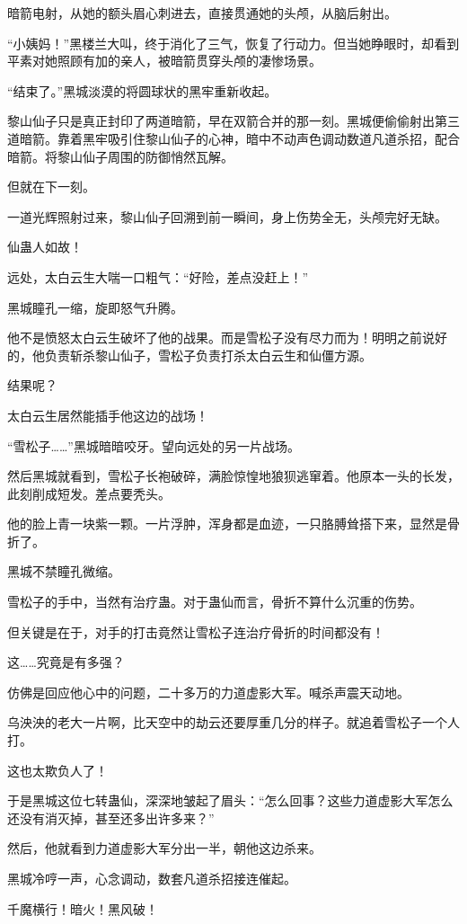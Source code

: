 \begin{this_body}
暗箭电射，从她的额头眉心刺进去，直接贯通她的头颅，从脑后射出。

“小姨妈！”黑楼兰大叫，终于消化了三气，恢复了行动力。但当她睁眼时，却看到平素对她照顾有加的亲人，被暗箭贯穿头颅的凄惨场景。

“结束了。”黑城淡漠的将圆球状的黑牢重新收起。

黎山仙子只是真正封印了两道暗箭，早在双箭合并的那一刻。黑城便偷偷射出第三道暗箭。靠着黑牢吸引住黎山仙子的心神，暗中不动声色调动数道凡道杀招，配合暗箭。将黎山仙子周围的防御悄然瓦解。

但就在下一刻。

一道光辉照射过来，黎山仙子回溯到前一瞬间，身上伤势全无，头颅完好无缺。

仙蛊人如故！

远处，太白云生大喘一口粗气：“好险，差点没赶上！”

黑城瞳孔一缩，旋即怒气升腾。

他不是愤怒太白云生破坏了他的战果。而是雪松子没有尽力而为！明明之前说好的，他负责斩杀黎山仙子，雪松子负责打杀太白云生和仙僵方源。

结果呢？

太白云生居然能插手他这边的战场！

“雪松子……”黑城暗暗咬牙。望向远处的另一片战场。

然后黑城就看到，雪松子长袍破碎，满脸惊惶地狼狈逃窜着。他原本一头的长发，此刻削成短发。差点要秃头。

他的脸上青一块紫一颗。一片浮肿，浑身都是血迹，一只胳膊耸搭下来，显然是骨折了。

黑城不禁瞳孔微缩。

雪松子的手中，当然有治疗蛊。对于蛊仙而言，骨折不算什么沉重的伤势。

但关键是在于，对手的打击竟然让雪松子连治疗骨折的时间都没有！

这……究竟是有多强？

仿佛是回应他心中的问题，二十多万的力道虚影大军。喊杀声震天动地。

乌泱泱的老大一片啊，比天空中的劫云还要厚重几分的样子。就追着雪松子一个人打。

这也太欺负人了！

于是黑城这位七转蛊仙，深深地皱起了眉头：“怎么回事？这些力道虚影大军怎么还没有消灭掉，甚至还多出许多来？”

然后，他就看到力道虚影大军分出一半，朝他这边杀来。

黑城冷哼一声，心念调动，数套凡道杀招接连催起。

千魔横行！暗火！黑风破！


\end{this_body}

